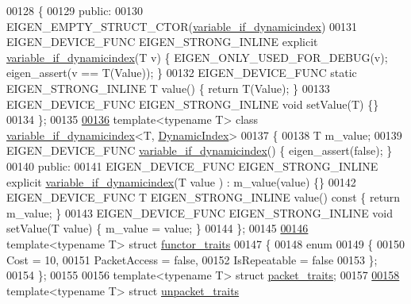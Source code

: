 \begin{DoxyCode}
00128 \{
00129   \textcolor{keyword}{public}:
00130     EIGEN\_EMPTY\_STRUCT\_CTOR(\hyperlink{class_eigen_1_1internal_1_1variable__if__dynamicindex}{variable\_if\_dynamicindex})
00131     EIGEN\_DEVICE\_FUNC EIGEN\_STRONG\_INLINE \textcolor{keyword}{explicit} \hyperlink{class_eigen_1_1internal_1_1variable__if__dynamicindex}{variable\_if\_dynamicindex}(T v) \{ 
      EIGEN\_ONLY\_USED\_FOR\_DEBUG(v); eigen\_assert(v == T(Value)); \}
00132     EIGEN\_DEVICE\_FUNC \textcolor{keyword}{static} EIGEN\_STRONG\_INLINE T value() \{ \textcolor{keywordflow}{return} T(Value); \}
00133     EIGEN\_DEVICE\_FUNC EIGEN\_STRONG\_INLINE \textcolor{keywordtype}{void} setValue(T) \{\}
00134 \};
00135 
\hyperlink{class_eigen_1_1internal_1_1variable__if__dynamicindex_3_01_t_00_01_dynamic_index_01_4}{00136} \textcolor{keyword}{template}<\textcolor{keyword}{typename} T> \textcolor{keyword}{class }\hyperlink{class_eigen_1_1internal_1_1variable__if__dynamicindex}{variable\_if\_dynamicindex}<T, 
      \hyperlink{namespace_eigen_a73c597189a4a99127175e8167c456fff}{DynamicIndex}>
00137 \{
00138     T m\_value;
00139     EIGEN\_DEVICE\_FUNC \hyperlink{class_eigen_1_1internal_1_1variable__if__dynamicindex}{variable\_if\_dynamicindex}() \{ eigen\_assert(\textcolor{keyword}{false}); \}
00140   \textcolor{keyword}{public}:
00141     EIGEN\_DEVICE\_FUNC EIGEN\_STRONG\_INLINE \textcolor{keyword}{explicit} \hyperlink{class_eigen_1_1internal_1_1variable__if__dynamicindex}{variable\_if\_dynamicindex}(T value
      ) : m\_value(value) \{\}
00142     EIGEN\_DEVICE\_FUNC T EIGEN\_STRONG\_INLINE value()\textcolor{keyword}{ const }\{ \textcolor{keywordflow}{return} m\_value; \}
00143     EIGEN\_DEVICE\_FUNC EIGEN\_STRONG\_INLINE \textcolor{keywordtype}{void} setValue(T value) \{ m\_value = value; \}
00144 \};
00145 
\hyperlink{struct_eigen_1_1internal_1_1functor__traits}{00146} \textcolor{keyword}{template}<\textcolor{keyword}{typename} T> \textcolor{keyword}{struct }\hyperlink{struct_eigen_1_1internal_1_1functor__traits}{functor\_traits}
00147 \{
00148   \textcolor{keyword}{enum}
00149   \{
00150     Cost = 10,
00151     PacketAccess = \textcolor{keyword}{false},
00152     IsRepeatable = \textcolor{keyword}{false}
00153   \};
00154 \};
00155 
00156 \textcolor{keyword}{template}<\textcolor{keyword}{typename} T> \textcolor{keyword}{struct }\hyperlink{struct_eigen_1_1internal_1_1packet__traits}{packet\_traits};
00157 
\hyperlink{struct_eigen_1_1internal_1_1unpacket__traits}{00158} \textcolor{keyword}{template}<\textcolor{keyword}{typename} T> \textcolor{keyword}{struct }\hyperlink{struct_eigen_1_1internal_1_1unpacket__traits}{unpacket\_traits}

\end{DoxyCode}
